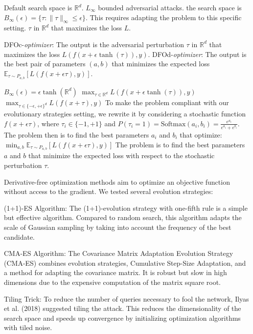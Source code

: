 
Default search space is $\mathbb{R}^d$.
$L_{\infty}$ bounded adversarial attacks. 
the search space is $B_{\infty}(\epsilon) = \{\tau : \|\tau\|_{\infty} \leq \epsilon\}$. This requires adapting the problem to this specific setting.
$\tau$ in $\mathbb{R}^d$ that maximizes the loss $L$.

DFOc-\textit{optimizer}: The output is the adversarial perturbation $\tau$ in $\mathbb{R}^d$ that maximizes the loss $L(f(x + \epsilon \tanh(\tau)), y)$.
DFOd-\textit{optimizer}: The output is the best pair of parameters $(a, b)$ that minimizes the expected loss $\mathbb{E}_{\tau \sim P_{a,b}} [L(f(x + \epsilon \tau), y)]$.

$B_{\infty}(\epsilon) = \epsilon \tanh(\mathbb{R}^d) $
$\max_{\tau \in \mathbb{R}^d} L(f(x + \epsilon \tanh(\tau)), y)$
$\max_{\tau \in \{-\epsilon, +\epsilon\}^d} L(f(x + \tau), y)$
To make the problem compliant with our evolutionary strategies setting, we rewrite it by considering a stochastic function $f(x + \epsilon \tau)$, where $\tau_i \in \{-1, +1\}$ and $P(\tau_i = 1) = \text{Softmax}(a_i, b_i) = \frac{e^{a_i}}{e^{a_i} + e^{b_i}}$. The problem then is to find the best parameters $a_i$ and $b_i$ that optimize:
$\min_{a,b} \mathbb{E}_{\tau \sim P_{a,b}} [L(f(x + \epsilon \tau), y)]$
The problem is to find the best parameters $a$ and $b$ that minimize the expected loss with respect to the stochastic perturbation $\tau$.

Derivative-free optimization methods aim to optimize an objective function without access to the gradient. We tested several evolution strategies:

{(1+1)-ES Algorithm}:
The (1+1)-evolution strategy with one-fifth rule is a simple but effective algorithm. Compared to random search, this algorithm adapts the scale of Gaussian sampling by taking into account the frequency of the best candidate.

{CMA-ES Algorithm}:
The Covariance Matrix Adaptation Evolution Strategy (CMA-ES) combines evolution strategies, Cumulative Step-Size Adaptation, and a method for adapting the covariance matrix. It is robust but slow in high dimensions due to the expensive computation of the matrix square root.

{Tiling Trick}:
To reduce the number of queries necessary to fool the network, Ilyas et al. (2018) suggested tiling the attack. This reduces the dimensionality of the search space and speeds up convergence by initializing optimization algorithms with tiled noise.